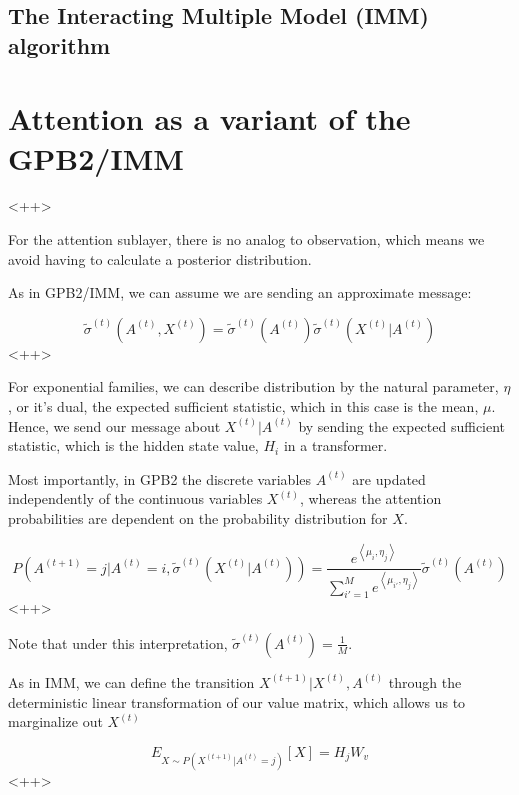 \documentclass[a4paper]{article}
\begin{document}
\subsection{The Interacting Multiple Model (IMM) algorithm}


\section{Attention as a variant of the GPB2/IMM}<++>

For the attention sublayer, there is no analog to observation, which means we avoid having to calculate a posterior distribution.  

As in GPB2/IMM, we can assume we are sending an approximate message:

\begin{equation}
  \tilde{\sigma}^{(t)} \left( A^{(t)}, X^{(t)} \right) = \tilde{\sigma}^{(t)} \left( A^{(t)} \right) \tilde{\sigma}^{(t)} \left( X^{(t)} \vert A^{(t)} \right)
  \label{<++>}
\end{equation}<++>

For exponential families, we can describe distribution by the natural parameter, $\eta$, or it's dual, the expected sufficient statistic, which in this case is the mean, $\mu$.  
Hence, we send our message about $X^{(t)} \vert A^{(t)}$ by sending the expected sufficient statistic, which is the hidden state value, $H_i$ in a transformer.

Most importantly, in GPB2 the discrete variables $A^{(t)}$ are updated independently of the continuous variables $X^{(t)}$, whereas the attention probabilities are dependent on the probability distribution for $X$.

\begin{equation}
  P\left( A^{(t+1)} = j \vert A^{(t)} = i, \tilde{\sigma}^{(t)} \left( X^{(t)} \vert A^{(t)} \right) \right) = \frac{ e^{ \left< \mu_i, \eta_j \right> } }{ \sum_{i'=1}^M e^{\left< \mu_{i'}, \eta_j\right>}} \tilde{\sigma}^{(t)} \left( A^{(t)} \right)
  \label{<++>}
\end{equation}<++>

Note that under this interpretation, $\tilde{\sigma}^{(t)} \left( A^{(t)} \right) = \frac{1}{M} $.

As in IMM, we can define the transition $X^{(t+1)} \vert X^{(t)}, A^{(t)}$ through the deterministic linear transformation of our value matrix, which allows us to marginalize out $X^{(t)}$

\begin{equation}
  E_{X \sim P(X^{(t+1)} \vert A^{(t)} = j )} \left[ X \right] = H_j W_v
  \label{}
\end{equation}<++>
\end{document}
